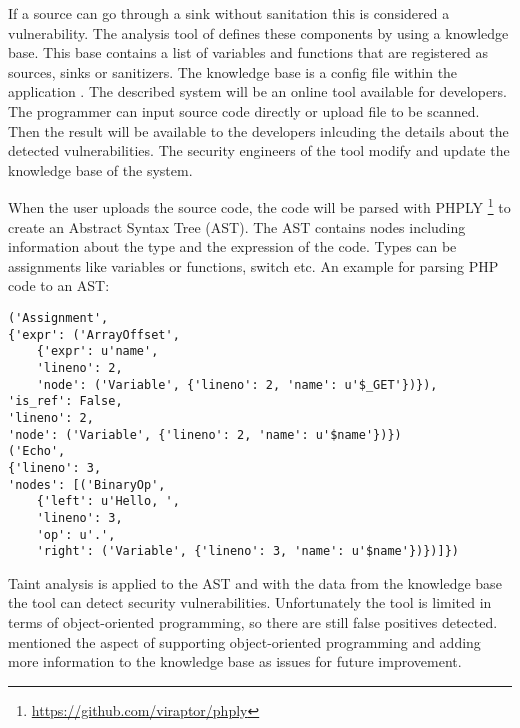 If a source can go through a sink without sanitation this is considered a vulnerability. The analysis tool of \textcite[]{Maskur2019} defines these components by using a knowledge base. This base contains a list of variables and functions that are registered as sources, sinks or sanitizers. The knowledge base is a config file within the application \autocite[3]{Maskur2019}. The described system will be an online tool available for developers. The programmer can input source code directly or upload file to be scanned. Then the result will be available to the developers inlcuding the details about the detected vulnerabilities. The security engineers of the tool modify and update the knowledge base of the system.\newline

When the user uploads the source code, the code will be parsed with PHPLY \footnote{ \url{https://github.com/viraptor/phply}} to create an Abstract Syntax Tree (AST). The AST contains nodes including information about the type and the expression of the code. Types can be assignments like variables or functions, switch etc. An example for parsing PHP code to an AST:


\begin{verbatim}
('Assignment', 
{'expr': ('ArrayOffset',
    {'expr': u'name', 
    'lineno': 2, 
    'node': ('Variable', {'lineno': 2, 'name': u'$_GET'})}),
'is_ref': False, 
'lineno': 2, 
'node': ('Variable', {'lineno': 2, 'name': u'$name'})}) 
('Echo',
{'lineno': 3, 
'nodes': [('BinaryOp',
    {'left': u'Hello, ', 
    'lineno': 3,
    'op': u'.', 
    'right': ('Variable', {'lineno': 3, 'name': u'$name'})})]})
\end{verbatim}


Taint analysis is applied to the AST and with the data from the knowledge base the tool can detect security vulnerabilities. Unfortunately the tool is limited in terms of object-oriented programming, so there are still false positives detected. \textcite[]{Maskur2019} mentioned the aspect of supporting object-oriented programming and adding more information to the knowledge base as issues for future improvement.




